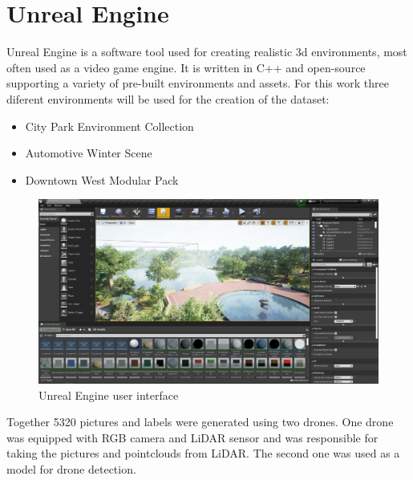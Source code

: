 \documentclass[twoside]{ctuthesis}
\theoremstyle{plain}
\theoremstyle{definition}
\theoremstyle{note}
\begin{document}
\section{Unreal Engine}
Unreal Engine is a software tool used for creating realistic 3d environments, most often used as a video game engine.
It is written in C++ and open-source supporting a variety of pre-built environments and assets. For this work three diferent environments will be used for the creation of the dataset:
\begin{itemize}
	\item City Park Environment Collection
	\item Automotive Winter Scene
	\item Downtown West Modular Pack
\end{itemize}
\pagebreak
\begin{figure}[h]
	\centering
	\includegraphics[width=\textwidth]{unreal_ui.png}
	\caption{Unreal Engine user interface}
\end{figure}
Together 5320 pictures and labels were generated using two drones. One drone was equipped with RGB camera and LiDAR sensor and was responsible for taking the pictures and pointclouds from LiDAR. The second one was used as a model for drone detection.
\end{document}
